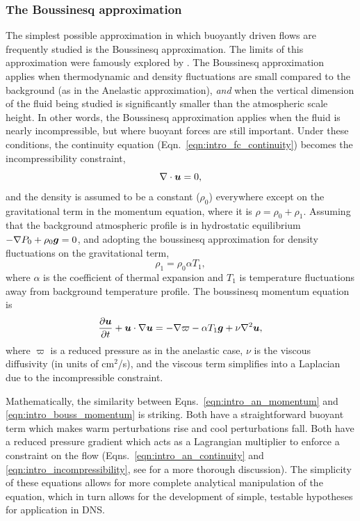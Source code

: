 \subsubsection{The Boussinesq approximation}
The simplest possible approximation in which buoyantly driven flows are frequently studied is the Boussinesq approximation.
The limits of this approximation were famously explored by \citet{spiegel&veronis1960}.
The Boussinesq approximation applies when thermodynamic and density fluctuations are small compared to the background (as in the Anelastic approximation), \emph{and} when the vertical dimension of the fluid being studied is significantly smaller than the atmospheric scale height.
In other words, the Boussinesq approximation applies when the fluid is nearly incompressible, but where buoyant forces are still important.
Under these conditions, the continuity equation (Eqn.~\ref{eqn:intro_fc_continuity}) becomes the incompressibility constraint,
\begin{equation}
\nabla\cdot\bm{u} = 0,
\label{eqn:intro_incompressibility}
\end{equation}
and the density is assumed to be a constant ($\rho_0$) everywhere except on the gravitational term in the momentum equation, where it is $\rho = \rho_0 + \rho_1$.
Assuming that the background atmospheric profile is in hydrostatic equilibrium $-\nabla P_0 + \rho_0 \bm{g} = 0$, and adopting the boussinesq approximation for density fluctuations on the gravitational term,
\begin{equation}
\rho_1 = \rho_0\alpha T_1,
\end{equation}
where $\alpha$ is the coefficient of thermal expansion and $T_1$ is temperature fluctuations away from background temperature profile.
The boussinesq momentum equation is
\begin{equation}
\frac{\partial \bm{u}}{\partial t} + \bm{u}\cdot\nabla\bm{u} = -\nabla \varpi - \alpha T_1 \bm{g} + \nu \nabla^2 \bm{u},
\label{eqn:intro_bouss_momentum}
\end{equation}
where $\varpi$ is a reduced pressure as in the anelastic case, $\nu$ is the viscous diffusivity (in units of cm$^2$/s), and the viscous term simplifies into a Laplacian due to the incompressible constraint.

Mathematically, the similarity between Eqns.~\ref{eqn:intro_an_momentum} and \ref{eqn:intro_bouss_momentum} is striking.
Both have a straightforward buoyant term which makes warm perturbations rise and cool perturbations fall.
Both have a reduced pressure gradient which acts as a Lagrangian multiplier to enforce a constraint on the flow (Eqns.~\ref{eqn:intro_an_continuity} and \ref{eqn:intro_incompressibility}, see \citet{vasil&all2013} for a more thorough discussion).
The simplicity of these equations allows for more complete analytical manipulation of the equation, which in turn allows for the development of simple, testable hypotheses for application in DNS.

